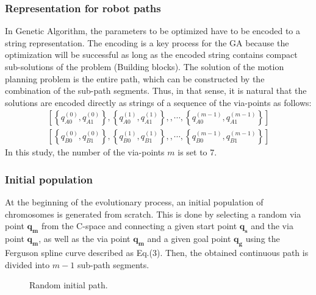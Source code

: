 \documentclass[12pt]{article} %
\begin{document}
\subsubsection{Representation for robot paths}

In Genetic Algorithm, the parameters to be optimized have to be encoded to a string representation. The encoding is a key process for the GA because the optimization will be successful as long as the encoded string contains compact sub-solutions of the problem (Building blocks). The solution of the motion planning problem is the entire path, which can be constructed by the combination of the sub-path segments. Thus, in that sense, it is natural that the solutions are encoded directly as strings of a sequence of the via-points as follows:
\begin{eqnarray}
\left[
\left\{ q_{A0}^{(0)}, q_{A1}^{(0)}\right\},
\left\{ q_{A0}^{(1)}, q_{A1}^{(1)}\right\},
, \cdots,
\left\{ q_{A0}^{(m-1)}, q_{A1}^{(m-1)}\right\}
\right]\\
\left[
\left\{ q_{B0}^{(0)}, q_{B1}^{(0)}\right\},
\left\{ q_{B0}^{(1)}, q_{B1}^{(1)}\right\},
, \cdots,
\left\{ q_{B0}^{(m-1)}, q_{B1}^{(m-1)}\right\}
\right]
\end{eqnarray}
In this study, the number of the via-points $m$ is set to 7. 

\subsubsection{Initial population}
At the beginning of the evolutionary process, an initial population of chromosomes is generated from scratch. This is done by selecting a random via point $\bm{q_m}$ from the C-space and connecting a given start point $\bm{q_s}$ and the via point $\bm{q_m}$, as well as the via point $\bm{q_m}$ and a given goal point $\bm{q_g}$ using the Ferguson spline curve described as Eq.(3). Then, the obtained continuous path is divided into $m-1$ sub-path segments.

\begin{figure}[H] %
\caption{Random initial path.}
\label{fig:initial}
\end{figure}
\end{document}
